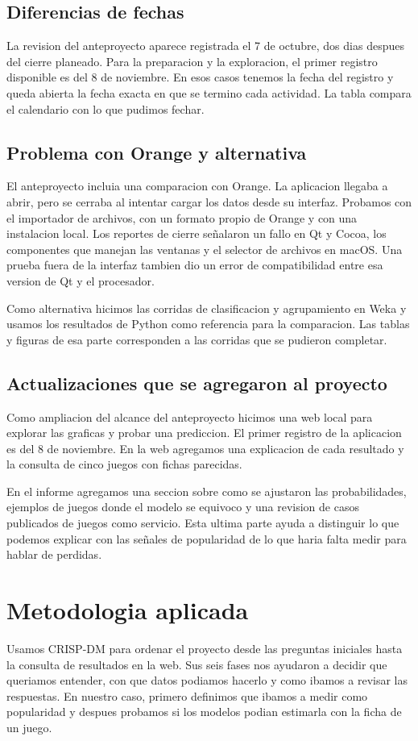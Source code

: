 \documentclass[letterpaper,11pt]{article}
\begin{document}
\subsection{Diferencias de fechas}
La revision del anteproyecto aparece registrada el 7 de octubre, dos dias despues del cierre planeado. Para la preparacion y la exploracion, el primer registro disponible es del 8 de noviembre. En esos casos tenemos la fecha del registro y queda abierta la fecha exacta en que se termino cada actividad. La tabla compara el calendario con lo que pudimos fechar.

\PlanTrabajo

\subsection{Problema con Orange y alternativa}
El anteproyecto incluia una comparacion con Orange. La aplicacion llegaba a abrir, pero se cerraba al intentar cargar los datos desde su interfaz. Probamos con el importador de archivos, con un formato propio de Orange y con una instalacion local. Los reportes de cierre señalaron un fallo en Qt y Cocoa, los componentes que manejan las ventanas y el selector de archivos en macOS. Una prueba fuera de la interfaz tambien dio un error de compatibilidad entre esa version de Qt y el procesador.

Como alternativa hicimos las corridas de clasificacion y agrupamiento en Weka y usamos los resultados de Python como referencia para la comparacion. Las tablas y figuras de esa parte corresponden a las corridas que se pudieron completar.

\subsection{Actualizaciones que se agregaron al proyecto}
Como ampliacion del alcance del anteproyecto hicimos una web local para explorar las graficas y probar una prediccion. El primer registro de la aplicacion es del 8 de noviembre. En la web agregamos una explicacion de cada resultado y la consulta de cinco juegos con fichas parecidas.

En el informe agregamos una seccion sobre como se ajustaron las probabilidades, ejemplos de juegos donde el modelo se equivoco y una revision de casos publicados de juegos como servicio. Esta ultima parte ayuda a distinguir lo que podemos explicar con las señales de popularidad de lo que haria falta medir para hablar de perdidas.

\section{Metodologia aplicada}
\label{sec:metodologia}
Usamos CRISP-DM para ordenar el proyecto desde las preguntas iniciales hasta la consulta de resultados en la web. Sus seis fases nos ayudaron a decidir que queriamos entender, con que datos podiamos hacerlo y como ibamos a revisar las respuestas. En nuestro caso, primero definimos que ibamos a medir como popularidad y despues probamos si los modelos podian estimarla con la ficha de un juego.
\end{document}
